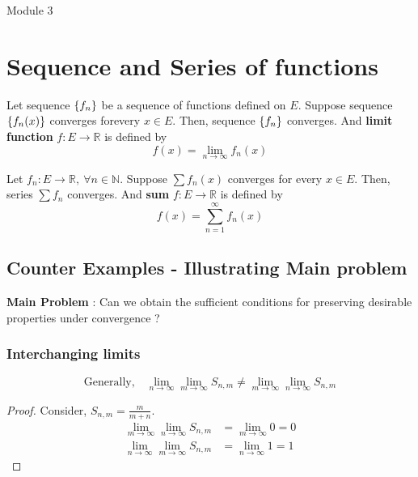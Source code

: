 \pagebreak

{\Large Module 3}
\section{Sequence and Series of functions}
\begin{definition}
	Let sequence $\{f_n\}$ be a sequence of functions defined on $E$.
	Suppose sequence $\{f_n(x)\}$ converges forevery $x \in E$.
	Then, sequence $\{f_n\}$ converges.
	And \textbf{limit function} $f : E \to \mathbb{R}$ is defined by
	\[ f(x) = \lim_{n \to \infty} f_n(x) \]
\end{definition}
\begin{definition}
	Let $f_n : E \to \mathbb{R},\ \forall n \in \mathbb{N}$.
	Suppose $\sum f_n(x)$ converges for every $x \in E$.
	Then, series $\sum f_n$ converges.
	And \textbf{sum} $f : E \to \mathbb{R}$ is defined by
	\[ f(x) = \sum_{n=1}^\infty f_n(x) \]
\end{definition}

\subsection{Counter Examples - Illustrating Main problem}
\textbf{Main Problem} : Can we obtain the sufficient conditions for preserving desirable properties under convergence ?
\subsubsection*{Interchanging limits}
\[ \text{Generally,}\quad \lim_{n \to \infty} \lim_{m \to \infty} S_{n,m} \ne \lim_{m \to \infty} \lim_{n \to \infty} S_{n,m} \]
\begin{proof}
Consider, $S_{n,m} = \frac{m}{m+n}$.
\begin{align*}
	\lim_{m \to \infty} \lim_{n \to \infty} S_{n,m} & = \lim_{m \to \infty } 0 = 0 \\
	\lim_{n \to \infty} \lim_{m \to \infty} S_{n,m} & = \lim_{n \to \infty } 1 = 1 
\end{align*}
\end{proof}
